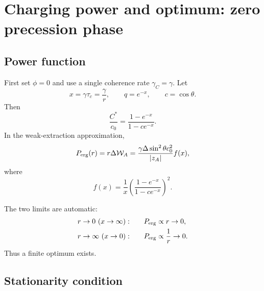 \documentclass[11pt,a4paper]{article}
\newcommand{\W}{\mathcal{W}}
\begin{document}
\section{Charging power and optimum: zero precession phase}

\subsection{Power function}

First set $\phi=0$ and use a single coherence rate $\gamma_C=\gamma$. Let
\begin{equation}
x=\gamma\tau_c=\frac{\gamma}{r},
\qquad
q=e^{-x},
\qquad
c=\cos\theta.
\end{equation}
Then
\begin{equation}
\frac{C^*}{c_0}=\frac{1-e^{-x}}{1-ce^{-x}}.
\end{equation}
In the weak-extraction approximation,
\begin{equation}
P_{\rm erg}(r)=r\Delta\W_A
=\frac{\gamma\Delta\sin^2\theta c_0^2}{|z_A|}f(x),
\end{equation}
where
\begin{equation}
f(x)=\frac1x\left(\frac{1-e^{-x}}{1-ce^{-x}}\right)^2.
\end{equation}

The two limits are automatic:
\begin{align}
r\to0\ (x\to\infty):&\qquad P_{\rm erg}\propto r\to0,\\
r\to\infty\ (x\to0):&\qquad P_{\rm erg}\propto \frac1r\to0.
\end{align}
Thus a finite optimum exists.

\subsection{Stationarity condition}
\end{document}
